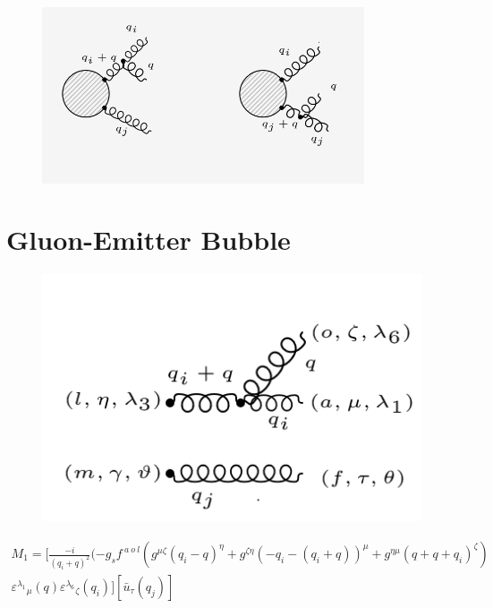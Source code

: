 
\begin{figure}[ht!]
\centering
\includegraphics[width=0.85\textwidth]{images/GG/GGDiagrams.png}
\end{figure}
\pagebreak
\section{Gluon-Emitter Bubble}
\begin{figure}[ht!]
\centering
\includegraphics[scale=0.7]{images/GG/M1gg.png}
\end{figure}
\begin{equation}
\begin{split}
M_1=[\frac{-i}{(q_i +q)^2}(-g_s f^{\:a\:o\:l}(g^{{\mu}{\zeta}}(q_i -q)^{\eta}+g^{{\zeta}{\eta}}(-q_i-(q_i +q))^{\mu}+g^{{\eta}{\mu}}(q +q+q_i)^{\zeta})\\
{\varepsilon^{\lambda_1}}_{\mu} (q) {\varepsilon^{\lambda_6}}_{\zeta} (q_i)][\bar{u}_{\tau}(q_j)]
\end{split}
\end{equation}

